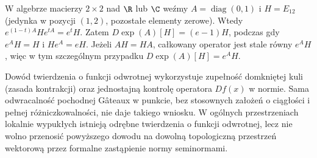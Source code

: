 \begin{przyklad}
\label{ex:noncommuting-exp15}
W algebrze macierzy $2\times2$ nad $\R$ lub $\C$ weźmy $A=\operatorname{diag}(0,1)$ i $H=E_{12}$ (jedynka w pozycji $(1,2)$, pozostałe elementy zerowe). Wtedy $e^{(1-t)A}He^{tA}=e^t H$. Zatem
$D\exp(A)[H]=(e-1)H$, podczas gdy $e^AH=H$ i
$He^A=eH$. Jeżeli $AH=HA$, całkowany operator
jest stale równy $e^AH$, więc w tym szczególnym
przypadku $D\exp(A)[H]=e^AH$.
\end{przyklad}

\begin{uwaga}
\label{rem:limits-inverse15}
Dowód twierdzenia o funkcji odwrotnej wykorzystuje zupełność domkniętej kuli (zasada kontrakcji) oraz jednostajną kontrolę operatora $Df(x)$ w normie. Sama odwracalność pochodnej Gâteaux w punkcie, bez stosownych założeń o ciągłości i pełnej różniczkowalności, nie daje takiego wniosku. W ogólnych przestrzeniach lokalnie wypukłych istnieją odrębne twierdzenia o funkcji odwrotnej, lecz nie wolno przenosić powyższego dowodu na dowolną topologiczną przestrzeń wektorową przez formalne zastąpienie normy seminormami.
\end{uwaga}
